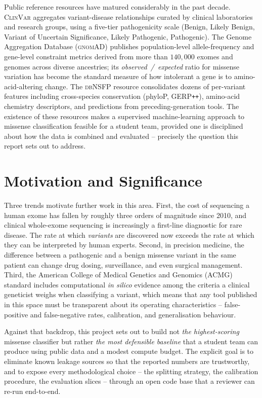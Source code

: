 \documentclass[11pt,a4paper,oneside]{report}
\begin{document}
Public reference resources have matured considerably in the past
decade. \textsc{ClinVar} \citep{landrum2020clinvar} aggregates
variant-disease relationships curated by clinical laboratories
and research groups, using a five-tier pathogenicity scale
(Benign, Likely Benign, Variant of Uncertain Significance,
Likely Pathogenic, Pathogenic). The Genome Aggregation Database
(\textsc{gnomAD}) \citep{karczewski2020gnomad} publishes
population-level allele-frequency and gene-level constraint
metrics derived from more than $140{,}000$ exomes and genomes
across diverse ancestries; its \emph{observed~/~expected} ratio
for missense variation has become the standard measure of how
intolerant a gene is to amino-acid-altering change. The
\textsc{dbNSFP} resource \citep{liu2020dbnsfp} consolidates
dozens of per-variant features including cross-species
conservation (phyloP, GERP\texttt{++}), amino-acid chemistry
descriptors, and predictions from preceding-generation tools.
The existence of these resources makes a supervised
machine-learning approach to missense classification feasible
for a student team, provided one is disciplined about how the
data is combined and evaluated -- precisely the question this
report sets out to address.

\section{Motivation and Significance}
\label{sec:intro-motivation}

Three trends motivate further work in this area. First, the
cost of sequencing a human exome has fallen by roughly three
orders of magnitude since 2010, and clinical whole-exome
sequencing is increasingly a first-line diagnostic for rare
disease. The rate at which \emph{variants} are discovered now
exceeds the rate at which they can be interpreted by human
experts. Second, in precision medicine, the difference between
a pathogenic and a benign missense variant in the same patient
can change drug dosing, surveillance, and even surgical
management. Third, the American College of Medical Genetics and
Genomics (ACMG) standard \citep{richards2015acmg} includes
computational \emph{in silico} evidence among the criteria a
clinical geneticist weighs when classifying a variant, which
means that any tool published in this space must be transparent about
its operating characteristics -- false-positive and
false-negative rates, calibration, and generalisation behaviour.

Against that backdrop, this project sets out to build not
\emph{the highest-scoring} missense classifier but rather
\emph{the most defensible baseline} that a student team can
produce using public data and a modest compute budget. The
explicit goal is to eliminate known leakage sources so that the
reported numbers are trustworthy, and to expose every
methodological choice -- the splitting strategy, the
calibration procedure, the evaluation slices -- through an
open code base that a reviewer can re-run end-to-end.
\end{document}
